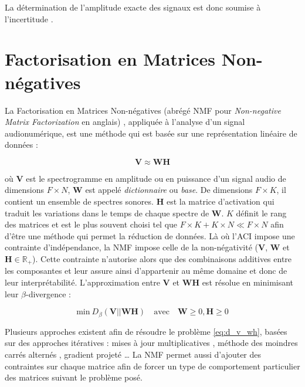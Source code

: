 La détermination de l'amplitude exacte des signaux est donc soumise à l'incertitude \cite{naik2011overview}.

\section{Factorisation en Matrices Non-négatives}

La Factorisation en Matrices Non-négatives (abrégé NMF pour \textit{Non-negative Matrix Factorization} en anglais) \cite{lee_learning_1999}, appliquée à l'analyse d'un signal audionumérique, est une méthode qui est basée sur une représentation linéaire de données :

\begin{equation}
\mathbf{V} \approx  \mathbf{WH}
\end{equation}

où $\mathbf{V}$ est le spectrogramme en amplitude ou en puissance d'un signal audio de dimensions $F \times N$, $\mathbf{W}$ est appelé \textit{dictionnaire} ou \textit{base}. De dimensions $F \times K$, il contient un ensemble de spectres sonores. $\mathbf{H}$ est la matrice d'activation qui traduit les variations dans le temps de chaque spectre de $\mathbf{W}$.  $K$ définit le rang des matrices et est le plus souvent choisi tel que $F\times K + K \times N \ll F \times N$ afin d'être une méthode qui permet la réduction de données.
Là où l'ACI impose une contrainte d'indépendance, la NMF impose celle de la \og non-négativité \fg{} ($\mathbf{V}$, $\mathbf{W}$ et $\mathbf{H} \in \mathbb{R}_+$). Cette contrainte n'autorise alors que des combinaisons additives entre les composantes et leur assure ainsi d'appartenir au même domaine et donc de leur interprétabilité. 
L'approximation entre $\mathbf{V}$ et $\mathbf{WH}$ est résolue en minimisant leur $\beta$-divergence :

\begin{equation}\label{eq:d_v_wh}
\text{min}~D_{\beta}\left(\textbf{V} \vert\vert \textbf{WH}\right) \quad \text{avec} \quad \mathbf{W} \geq 0, \mathbf{H} \geq 0
\end{equation}

Plusieurs approches existent afin de résoudre le problème \ref{eq:d_v_wh}, basées sur des approches itératives : mises à jour multiplicatives \cite{lee_algorithms_2000}, méthode des moindres carrés alternés \cite{cichocki_regularized_2007}, gradient projeté \cite{lin_projected_2007} \dots{} La NMF permet aussi d'ajouter des contraintes sur chaque matrice \cite{virtanen_monaural_2007} afin de forcer un type de comportement particulier des matrices suivant le problème posé.

